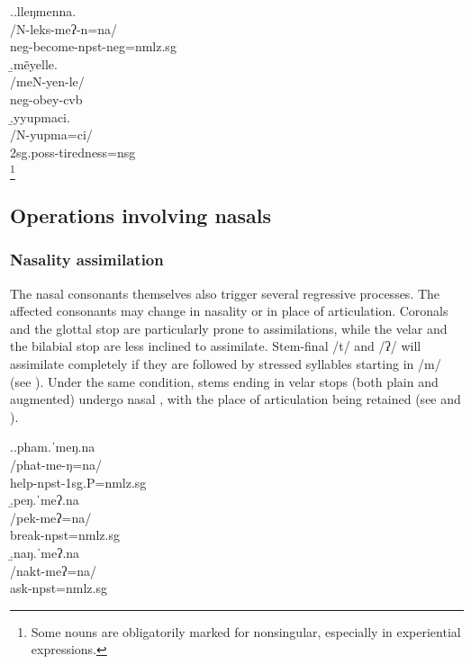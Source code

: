 \ex.\a.\glll lleŋmenna.\\
		/N-leks-meʔ-n=na/\\
		{\sc neg-}become{\sc [3sg]-npst-neg=nmlz.sg}\\
		\b.\glll mẽyelle.\\
		/meN-yen-le/\\
		{\sc neg-}obey{\sc -cvb}\\
		\b.\glll yyupmaci.\\
		/N-yupma=ci/\\
		{\sc 2sg.poss-}tiredness{\sc =nsg}\\
		\footnote{Some nouns are obligatorily marked for nonsingular, especially in experiential expressions.}


\subsection{Operations involving nasals}\label{nas-strat}			

\subsubsection{Nasality  assimilation}
		
The nasal consonants themselves also trigger several regressive  processes. The affected consonants may change in nasality or in place of articulation. Coronals and the glottal stop are particularly prone to assimilations, while the velar and the bilabial stop are less inclined to assimilate. Stem-final /t/ and /ʔ/ will assimilate completely if they are followed by stressed syllables starting in /m/ (see \Next[a]). Under the same condition, stems ending in velar stops (both plain and augmented) undergo nasal ,  with the place of articulation being retained (see \Next[b] and \Next[c]).
\largerpage

\ex.\a.\glll pham.ˈmeŋ.na\\
/phat-me-ŋ=na/\\
help{\sc [3sg.A]-npst-1sg.P=nmlz.sg}\\
\b.\glll  peŋ.ˈmeʔ.na\\
/pek-meʔ=na/\\
break{\sc [3sg]-npst=nmlz.sg}\\
\b.\glll  naŋ.ˈmeʔ.na\\
/nakt-meʔ=na/\\
ask{\sc [3sg]-npst=nmlz.sg}\\

